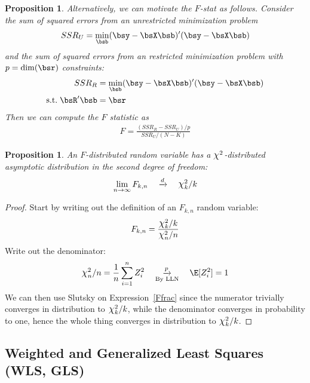 \documentclass[12pt]{article}
\theoremstyle{plain}
\newtheorem{prop}[thm]{Proposition}
\theoremstyle{definition}
\theoremstyle{remark}
\newcommand*{\Chi}{\mbox{\large$\chi$}} %
\newcommand{\pto}{\xrightarrow{p}}
\newcommand{\dto}{\xrightarrow{d}}
\newcommand{\sumin}{\sum^n_{i=1}}
\newcommand{\limn}{\lim_{n\rightarrow\infty}}
\begin{document}
\begin{prop}
Alternatively, we can motivate the $F$-stat as follows. Consider the sum
of squared errors from an \emph{unrestricted} minimization problem
\begin{align*}
  SSR_U = \min_{\bsb} (\bsy-\bsX\bsb)'(\bsy-\bsX\bsb)
\end{align*}
and the sum of squared errors from an \emph{restricted} minimization
problem with $p = \dim(\bsr)$ constraints:
\begin{align*}
  SSR_R &= \min_{\bsb} (\bsy-\bsX\bsb)'(\bsy-\bsX\bsb) \\
  \text{s.t.} \; \bsR' \bsb &= \bsr
\end{align*}
Then we can compute the $F$ statistic as
\begin{align*}
  F = \frac{(SSR_R-SSR_U)/p}{SSR_U/(N-K)}
\end{align*}
\end{prop}

\begin{prop}
An $F$-distributed random variable has a $\Chi^2$-distributed asymptotic
distribution in the second degree of freedom:
\begin{align*}
  \limn F_{k,n} \quad\dto \quad\Chi_k^2 / k
\end{align*}
\end{prop}
\begin{proof}
Start by writing out the definition of an $F_{k,n}$ random variable:
\begin{align}
  F_{k,n} =
  \frac{%
    \Chi^2_k/k
  }{\Chi^2_{n}/n}
  \label{Ffrac}
\end{align}
Write out the denominator:
\begin{align*}
  \Chi^2_{n}/n
  = \frac{1}{n} \sumin Z_i^2
  \quad\underset{\text{By LLN}}{\pto}\quad
  \E[Z_i^2] = 1
\end{align*}
We can then use Slutsky on Expression~\ref{Ffrac} since the numerator
trivially converges in distribution to $\Chi_k^2/k$, while the
denominator converges in probability to one, hence the whole thing
converges in distribution to $\Chi_k^2/k$.

\end{proof}

\clearpage
\subsection{Weighted and Generalized Least Squares (WLS, GLS)}
\end{document}
